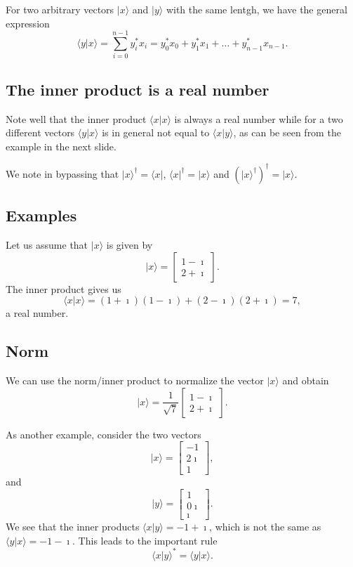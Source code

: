For two arbitrary vectors $\vert x\rangle$ and $\vert y\rangle$ with the same lentgh, we have the
general expression
\[
\langle y \vert x\rangle = \sum_{i=0}^{n-1} y_i^*x_i=y_0^*x_0+y_1^*x_1+\dots + y_{n-1}^*x_{n-1}. 
\]

\subsection{The inner product is a real number}

\begin{block}{}
Note well that the inner product $\langle x \vert x\rangle$ is always a real number while for a two different vectors $\langle y \vert x\rangle$ is in general not equal to
$\langle x \vert y\rangle$, as can be seen from the example in the next slide. 
\end{block}

\begin{block}{}
We note in bypassing that $\vert x\rangle^{\dagger}=\langle x \vert$,
$\langle x\vert^{\dagger}=\vert x\rangle$ and $(\vert
x\rangle^{\dagger})^{\dagger}=\vert x \rangle$.
\end{block}

\subsection{Examples}

Let us assume that $\vert x \rangle$ is given by
\[
\vert x \rangle = \begin{bmatrix} 1-\imath \\ 2+\imath \end{bmatrix}.
\]
The inner product gives us
\[
\langle x\vert x \rangle = (1+\imath)(1-\imath)+(2-\imath)(2+\imath)=7,
\]
a real number.

\subsection{Norm}
We can use the norm/inner product to normalize the vector $\vert x \rangle$ and obtain
\[
\vert x \rangle = \frac{1}{\sqrt{7}}\begin{bmatrix} 1-\imath \\ 2+\imath \end{bmatrix}.
\]

As another example, consider the two vectors
\[
\vert x \rangle = \begin{bmatrix} -1 \\ 2\imath \\ 1\end{bmatrix},
\]
and
\[
\vert y \rangle = \begin{bmatrix} 1 \\ 0\imath \\ \imath\end{bmatrix}.
\]
We see that the inner products $\langle x\vert y \rangle = -1+\imath$, which is not the same as
$\langle y\vert x \rangle = -1-\imath$. This leads to the important rule
\[
\langle x\vert y\rangle^* = \langle y \vert x\rangle. 
\]

